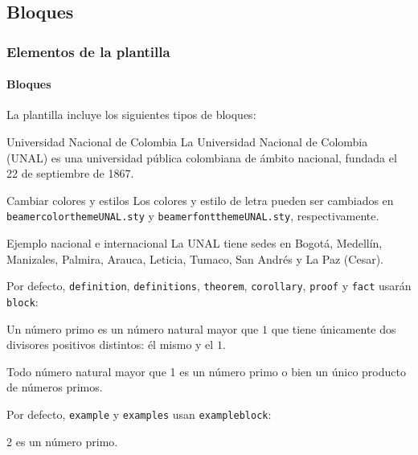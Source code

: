 \documentclass[aspectratio=169,usenames,dvipsnames,spanish]{beamer}
\begin{document}
\subsection{Bloques}

\begin{frame}
\frametitle{Elementos de la plantilla}
\framesubtitle{Bloques}
   La plantilla incluye los siguientes tipos de bloques:
\begin{block}{Universidad Nacional de Colombia}
\justifying 
   La Universidad Nacional de Colombia (UNAL) es una universidad pública colombiana de ámbito nacional, fundada el 22 de septiembre de 1867.
\end{block}
\begin{alertblock}{Cambiar colores y estilos}
\justifying 
    Los colores y estilo de letra pueden ser cambiados en \texttt{beamercolorthemeUNAL.sty} y \texttt{beamerfontthemeUNAL.sty}, respectivamente.
\end{alertblock}
\begin{exampleblock}{Ejemplo nacional e internacional}
\justifying 
    La UNAL tiene sedes en Bogotá, Medellín, Manizales, Palmira, Arauca, Leticia, Tumaco, San Andrés y La Paz (Cesar).
\end{exampleblock}
\end{frame}

\begin{frame}
    Por defecto, \texttt{definition}, \texttt{definitions}, \texttt{theorem}, \texttt{corollary}, \texttt{proof} y \texttt{fact} usarán \texttt{block}:
    \begin{definition}
    \justifying 
      Un número primo es un número natural mayor que $1$ que tiene únicamente dos divisores positivos distintos: él mismo y el $1$.
    \end{definition}
    \begin{theorem}
    \justifying 
        Todo número natural mayor que 1 es un número primo o bien un único producto de números primos.
    \end{theorem}

    Por defecto, \texttt{example} y \texttt{examples} usan \texttt{exampleblock}:
    
    \begin{example}
        2 es un número primo.
    \end{example}
\end{frame}
\end{document}
